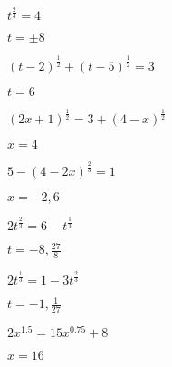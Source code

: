 \documentclass{ximera}
\begin{document}
\begin{question}
$t^{\frac{2}{3}} = 4$
\begin{solution}
$t = \pm 8$
\end{solution}

\end{question}

\begin{question}
$(t - 2)^{\frac{1}{2}} + (t - 5)^{\frac{1}{2}} = 3$

\begin{solution}
$t = 6$
\end{solution}

\end{question}

\begin{question}
$(2x+1)^{\frac{1}{2}} = 3 + (4-x)^{\frac{1}{2}}$
\begin{solution}
$x = 4$

\end{solution}

\end{question}

\begin{question}
$5 - (4-2x)^{\frac{2}{3}} = 1$

\begin{solution}
$x=-2, 6$  
\end{solution}

\end{question}

\begin{question}
$2t^{\frac{2}{3}} = 6 - t^{\frac{1}{3}}$  %
\begin{solution}
$t=-8, \frac{27}{8}$
\end{solution}

\end{question}

\begin{question}
$2t^{\frac{1}{3}} = 1-3t^{\frac{2}{3}} $  %

\begin{solution}
$t=-1, \frac{1}{27}$   

\end{solution}

\end{question}

\begin{question}
$2x^{1.5} = 15x^{0.75} + 8$  %
\begin{solution}
$x=16$ 
\end{solution}

\end{question}
\end{document}
